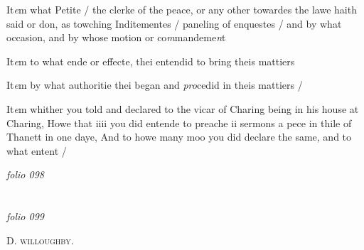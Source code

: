 \documentclass[12pt, a4paper]{book}
\begin{document}
            		
				\marginpar[\vspace{0.5cm}{\textcolor{Gray}{10}}]{}
			 
		\ifthenelse{\isodd{\thepage}}
		{\reversemarginpar}
		{\normalmarginpar}
		 It\textit{e}m what Petite / the clerke of the peace, or any
 other towardes the lawe haith said or don, as
 towching Inditementes / paneling of enquestes / and
 by what occasion, and by whose motion or co\textit{m}mandeme\textit{n}t
 
            		
				\marginpar[\vspace{0.5cm}{\textcolor{Gray}{11}}]{}
			 
		\ifthenelse{\isodd{\thepage}}
		{\reversemarginpar}
		{\normalmarginpar}
		 It\textit{e}m to what ende or effecte, thei entendid to bring
 theis mattiers
 
            	
            		
				\marginpar[\vspace{0.5cm}{\textcolor{Gray}{12}}]{}
			
            		
		\ifthenelse{\isodd{\thepage}}
		{\reversemarginpar}
		{\normalmarginpar}
		 It\textit{e}m by what authoritie thei began and \textit{pro}cedid in
	theis mattiers / 
            		
		\ifthenelse{\isodd{\thepage}}
		{\reversemarginpar}
		{\normalmarginpar}
		It\textit{e}m whither you told and declared to the vicar of Charing
 being in his house at Charing, Howe that iiii you did
 entende to preache ii sermons a pece in thile of Thanett
 in one daye, And to howe many moo you did declare the
 same, and to what entent /

\dotfill
						\newpage
{}

\textit{folio 098}


         \vspace*{4cm}
         
\dotfill
						  \section*{}

\textit{folio 099}




            		
				\begin{center} \begin{large} {\scshape D. willoughby.} \end{large} \end{center}
			
\end{document}
